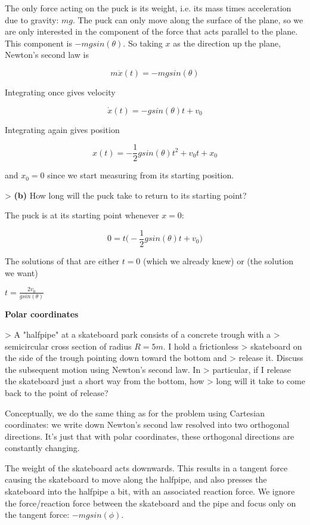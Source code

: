 The only force acting on the puck is its weight, i.e. its mass times
acceleration due to gravity: $mg$. The puck can only move along the surface of
the plane, so we are only interested in the component of the force that acts
parallel to the plane. This component is $-mg sin(\theta)$. So taking $x$ as the
direction up the plane, Newton's second law is

$$ m\ddot x(t) = -mgsin(\theta)$$

Integrating once gives velocity

$$ \dot x(t) = -g sin(\theta) t + v_0$$

Integrating again gives position

$$ x(t) = -\frac{1}{2} g sin(\theta) t^2 + v_0t + x_0$$

and $x_0=0$ since we start measuring from its starting position.

> \textbf{(b)} How long will the puck take to return to its starting point?

The puck is at its starting point whenever $x = 0$:

$$0 = t\bigg(-\frac{1}{2} g sin(\theta) t + v_0\bigg)$$

The solutions of that are either $t=0$ (which we already knew) or (the solution
we want)

$t = \frac{2v_0}{g sin(\theta)}$

\textbf{Polar coordinates}

> A "halfpipe" at a skateboard park consists of a concrete trough with a
> semicircular cross section of radius $R = 5m$. I hold a frictionless
> skateboard on the side of the trough pointing down toward the bottom and
> release it. Discuss the subsequent motion using Newton's second law. In
> particular, if I release the skateboard just a short way from the bottom, how
> long will it take to come back to the point of release?

Conceptually, we do the same thing as for the problem using Cartesian
coordinates: we write down Newton's second law resolved into two orthogonal
directions. It's just that with polar coordinates, these orthogonal directions
are constantly changing.

The weight of the skateboard acts downwards. This results in a tangent force
causing the skateboard to move along the halfpipe, and also presses the
skateboard into the halfpipe a bit, with an associated reaction force. We
ignore the force/reaction force between the skateboard and the pipe and focus
only on the tangent force: $-mg sin(\phi)$.

